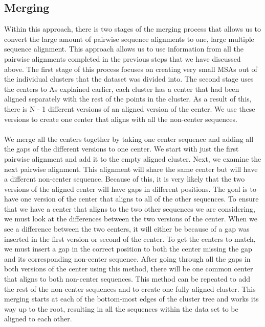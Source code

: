 \subsection{Merging}
Within this approach, there is two stages of the merging process that allows us to convert the large amount of pairwise sequence alignments to one, large multiple sequence alignment. This approach allows us to use information from all the pairwise alignments completed in the previous steps that we have discussed above. The first stage of this process focuses on creating very small MSAs out of the individual clusters that the dataset was divided into. The second stage uses the centers to As explained earlier, each cluster has a center that had been aligned separately with the rest of the points in the cluster. As a result of this, there is N - 1 different versions of an aligned version of the center. We use these versions to create one center that aligns with all the non-center sequences. \\
\\We merge all the centers together by taking one center sequence and adding all the gaps of the different versions to one center. We start with just the first pairwise alignment and add it to the empty aligned cluster. Next, we examine the next pairwise alignment. This alignment will share the same center but will have a different non-center sequence. Because of this, it is very likely that the two versions of the aligned center will have gaps in different positions. The goal is to have one version of the center that aligns to all of the other sequences. To ensure that we have a center that aligns to the two other sequences we are considering, we must look at the differences between the two versions of the center. When we see a difference between the two centers, it will either be because of a gap was inserted in the first version or second of the center. To get the centers to match, we must insert a gap in the correct position to both the center missing the gap and its corresponding non-center sequence. After going through all the gaps in both versions of the center using this method, there will be one common center that aligns to both non-center sequences. This method can be repeated to add the rest of the non-center sequences and to create one fully aligned cluster. This merging starts at each of the bottom-most edges of the cluster tree and works its way up to the root, resulting in all the sequences within the data set to be aligned to each other.

\vspace{0.5cm} 

